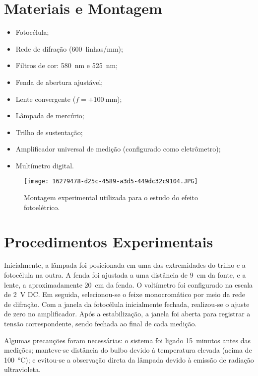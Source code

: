 \documentclass[conference]{IEEEtran}
\begin{document}
\section{Materiais e Montagem}
\begin{itemize}
    \item Fotocélula;
    \item Rede de difração (\SI{600}{linhas/mm});
    \item Filtros de cor: \SI{580}{\nano\meter} e \SI{525}{\nano\meter};
    \item Fenda de abertura ajustável;
    \item Lente convergente ($f = +\SI{100}{\milli\meter}$);
    \item Lâmpada de mercúrio;
    \item Trilho de sustentação;
    \item Amplificador universal de medição (configurado como eletrômetro);
    \item Multímetro digital.
\end{itemize}

\begin{figure}[!htbp]
    \centering
    \texttt{[image: 16279478-d25c-4589-a3d5-449dc32c9104.JPG]}
    \caption{Montagem experimental utilizada para o estudo do efeito fotoelétrico.}
    \label{fig:montagem}
\end{figure}

\section{Procedimentos Experimentais}
Inicialmente, a lâmpada foi posicionada em uma das extremidades do trilho e a fotocélula na outra. A fenda foi ajustada a uma distância de \SI{9}{\centi\meter} da fonte, e a lente, a aproximadamente \SI{20}{\centi\meter} da fenda. O voltímetro foi configurado na escala de \SI{2}{\volt} DC. Em seguida, selecionou-se o feixe monocromático por meio da rede de difração. Com a janela da fotocélula inicialmente fechada, realizou-se o ajuste de zero no amplificador. Após a estabilização, a janela foi aberta para registrar a tensão correspondente, sendo fechada ao final de cada medição.

Algumas precauções foram necessárias: o sistema foi ligado \SI{15}{minutos} antes das medições; manteve-se distância do bulbo devido à temperatura elevada (acima de \SI{100}{\celsius}); e evitou-se a observação direta da lâmpada devido à emissão de radiação ultravioleta.
\end{document}
